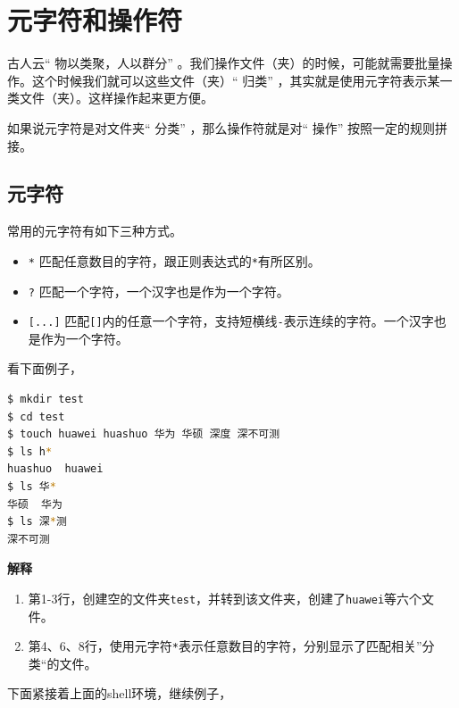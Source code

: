 \documentclass[doctor,openright,twoside]{sjtuthesis}
\providecommand{\tightlist}{%
    \setlength{\itemsep}{0pt}\setlength{\parskip}{0pt}}
\newcommand{\passthrough}[1]{#1}
\theoremstyle{plain}
\theoremstyle{definition}
\theoremstyle{remark}
\theoremstyle{ocrenumbox}
\theoremstyle{plain}
\begin{document}
\hypertarget{section-60}{%
\section{元字符和操作符}\label{section-60}}

古人云`` 物以类聚，人以群分'' 。我们操作文件（夹）的时候，可能就需要批量操作。这个时候我们就可以这些文件（夹）`` 归类'' ，其实就是使用元字符表示某一类文件（夹）。这样操作起来更方便。

如果说元字符是对文件夹`` 分类'' ，那么操作符就是对`` 操作'' 按照一定的规则拼接。

\hypertarget{filesystem:metachar}{%
\subsection{元字符}\label{filesystem:metachar}}

常用的元字符有如下三种方式。

\begin{itemize}
\tightlist
\item
  \passthrough{\lstinline!*!} 匹配任意数目的字符，跟正则表达式的\passthrough{\lstinline!*!}有所区别。
\item
  \passthrough{\lstinline!?!} 匹配一个字符，一个汉字也是作为一个字符。
\item
  \passthrough{\lstinline![...]!} 匹配\passthrough{\lstinline![]!}内的任意一个字符，支持短横线\passthrough{\lstinline!-!}表示连续的字符。一个汉字也是作为一个字符。
\end{itemize}

看下面例子，

\begin{lstlisting}[language=bash]
$ mkdir test
$ cd test
$ touch huawei huashuo 华为 华硕 深度 深不可测
$ ls h*
huashuo  huawei
$ ls 华*
华硕  华为
$ ls 深*测
深不可测
\end{lstlisting}

\textbf{解释}

\begin{enumerate}
\def\labelenumi{\arabic{enumi}.}
\tightlist
\item
  第1-3行，创建空的文件夹\passthrough{\lstinline!test!}，并转到该文件夹，创建了\passthrough{\lstinline!huawei!}等六个文件。
\item
  第4、6、8行，使用元字符\passthrough{\lstinline!*!}表示任意数目的字符，分别显示了匹配相关''分类``的文件。
\end{enumerate}

下面紧接着上面的shell环境，继续例子，
\end{document}
